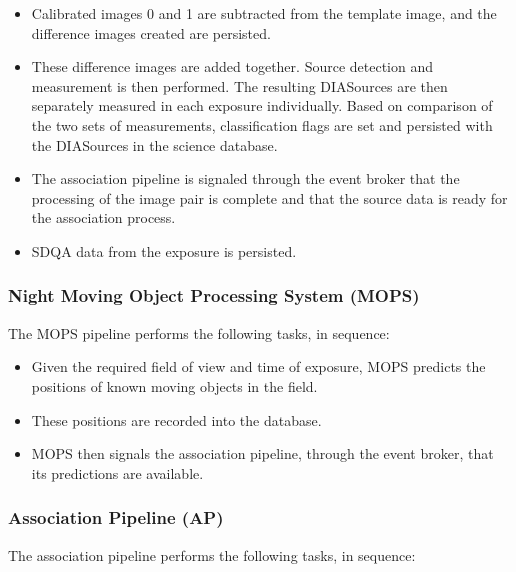 \begin{itemize}
\item Calibrated images 0 and 1 are subtracted from the template
image, and the difference images created are persisted.

\item These difference images are added together. Source detection
and measurement is then performed. The resulting DIASources are then
separately measured in each exposure individually.  Based on
comparison of the two sets of measurements, classification
flags are set and persisted with the DIASources in the science database.

\item The association pipeline is signaled through the event broker
that the processing of the image pair is complete and that the source
data is ready for the association process.

\item SDQA data from the exposure is persisted.

\end{itemize}

\subsubsection{Night Moving Object Processing System (MOPS)}

The MOPS pipeline performs the following tasks, in sequence:

\begin{itemize}

\item Given the required field of view and time of exposure, MOPS predicts the positions 
of known moving objects in the field.

\item These positions are recorded into the database.

\item MOPS then signals the association pipeline, through the event
broker, that its predictions are available.

\end{itemize}

\subsubsection{Association Pipeline (AP)}

The association pipeline performs the following tasks, in sequence:

